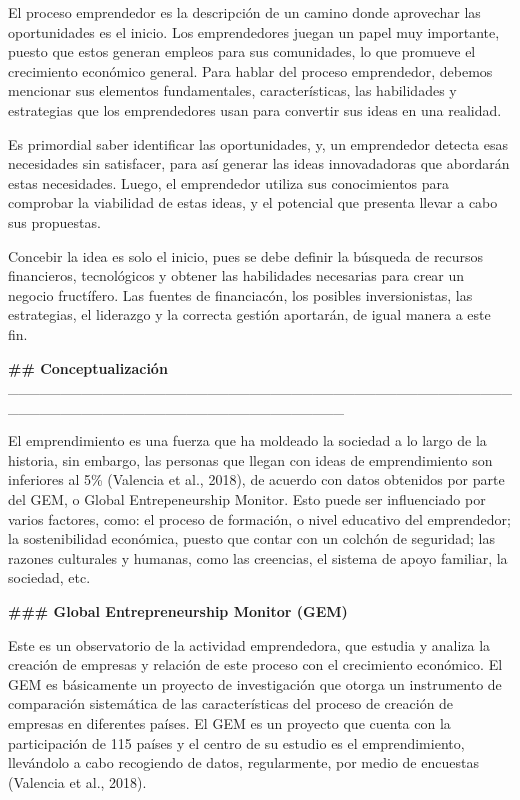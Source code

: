 \documentclass[
  letterpaper,
  DIV=11,
  numbers=noendperiod]{scrreprt}
\begin{document}
El proceso emprendedor es la descripción de un camino donde aprovechar
las oportunidades es el inicio. Los emprendedores juegan un papel muy
importante, puesto que estos generan empleos para sus comunidades, lo
que promueve el crecimiento económico general. Para hablar del proceso
emprendedor, debemos mencionar sus elementos fundamentales,
características, las habilidades y estrategias que los emprendedores
usan para convertir sus ideas en una realidad.

Es primordial saber identificar las oportunidades, y, un emprendedor
detecta esas necesidades sin satisfacer, para así generar las ideas
innovadadoras que abordarán estas necesidades. Luego, el emprendedor
utiliza sus conocimientos para comprobar la viabilidad de estas ideas, y
el potencial que presenta llevar a cabo sus propuestas.

Concebir la idea es solo el inicio, pues se debe definir la búsqueda de
recursos financieros, tecnológicos y obtener las habilidades necesarias
para crear un negocio fructífero. Las fuentes de financiacón, los
posibles inversionistas, las estrategias, el liderazgo y la correcta
gestión aportarán, de igual manera a este fin.

\textbf{\#\# Conceptualización}
\_\_\_\_\_\_\_\_\_\_\_\_\_\_\_\_\_\_\_\_\_\_\_\_\_\_\_\_\_\_\_\_\_\_\_\_\_\_\_\_\_\_\_\_\_\_\_\_\_\_\_\_\_\_\_\_\_\_\_\_\_\_\_\_\_\_\_\_\_\_\_\_\_\_\_\_\_\_\_\_

El emprendimiento es una fuerza que ha moldeado la sociedad a lo largo
de la historia, sin embargo, las personas que llegan con ideas de
emprendimiento son inferiores al 5\% (Valencia et al., 2018), de acuerdo
con datos obtenidos por parte del GEM, o Global Entrepeneurship Monitor.
Esto puede ser influenciado por varios factores, como: el proceso de
formación, o nivel educativo del emprendedor; la sostenibilidad
económica, puesto que contar con un colchón de seguridad; las razones
culturales y humanas, como las creencias, el sistema de apoyo familiar,
la sociedad, etc.

\textbf{\#\#\# Global Entrepreneurship Monitor (GEM)}

Este es un observatorio de la actividad emprendedora, que estudia y
analiza la creación de empresas y relación de este proceso con el
crecimiento económico. El GEM es básicamente un proyecto de
investigación que otorga un instrumento de comparación sistemática de
las características del proceso de creación de empresas en diferentes
países. El GEM es un proyecto que cuenta con la participación de 115
países y el centro de su estudio es el emprendimiento, llevándolo a cabo
recogiendo de datos, regularmente, por medio de encuestas (Valencia et
al., 2018).
\end{document}
